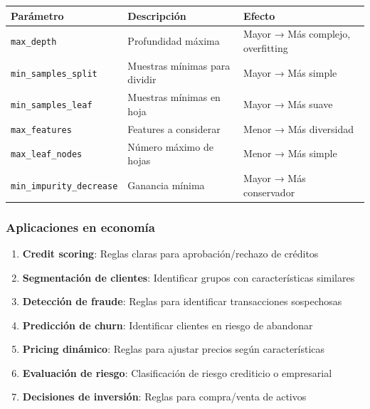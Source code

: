 \documentclass[
  doc,
  floatsintext,
  longtable,
  a4paper,
  nolmodern,
  notxfonts,
  notimes,
  12pt,
  colorlinks=true,linkcolor=blue,citecolor=blue,urlcolor=blue]{apa7}
\newcounter{none} %
\begin{document}
{\def\LTcaptype{none} %
\begin{longtable}[]{@{}
  >{\raggedright\arraybackslash}p{}
  >{\raggedright\arraybackslash}p{}
  >{\raggedright\arraybackslash}p{}@{}}
\toprule\noalign{}
\begin{minipage}[b]{\linewidth}\raggedright
Parámetro
\end{minipage} & \begin{minipage}[b]{\linewidth}\raggedright
Descripción
\end{minipage} & \begin{minipage}[b]{\linewidth}\raggedright
Efecto
\end{minipage} \\
\midrule\noalign{}
\endhead
\bottomrule\noalign{}
\endlastfoot
\texttt{max\_depth} & Profundidad máxima & Mayor → Más complejo,
overfitting \\
\texttt{min\_samples\_split} & Muestras mínimas para dividir & Mayor →
Más simple \\
\texttt{min\_samples\_leaf} & Muestras mínimas en hoja & Mayor → Más
suave \\
\texttt{max\_features} & Features a considerar & Menor → Más
diversidad \\
\texttt{max\_leaf\_nodes} & Número máximo de hojas & Menor → Más
simple \\
\texttt{min\_impurity\_decrease} & Ganancia mínima & Mayor → Más
conservador \\
\end{longtable}
}

\subsubsection{Aplicaciones en
economía}\label{aplicaciones-en-economuxeda-1}

\begin{enumerate}
\def\labelenumi{\arabic{enumi}.}
\item
  \textbf{Credit scoring}: Reglas claras para aprobación/rechazo de
  créditos
\item
  \textbf{Segmentación de clientes}: Identificar grupos con
  características similares
\item
  \textbf{Detección de fraude}: Reglas para identificar transacciones
  sospechosas
\item
  \textbf{Predicción de churn}: Identificar clientes en riesgo de
  abandonar
\item
  \textbf{Pricing dinámico}: Reglas para ajustar precios según
  características
\item
  \textbf{Evaluación de riesgo}: Clasificación de riesgo crediticio o
  empresarial
\item
  \textbf{Decisiones de inversión}: Reglas para compra/venta de activos
\end{enumerate}
\end{document}
